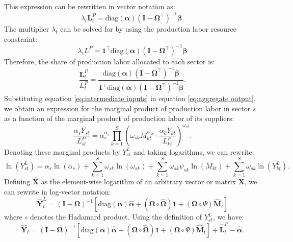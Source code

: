 \documentclass[12pt]{article}
\begin{document}
This expression can be rewritten in vector notation as:
\begin{equation*}
    \lambda_t \mathbf{L}_t^P = \text{diag}(\bm{\alpha}) (\mathbf{I} - \bm{\Omega}^{\top})^{-1} \bm{\beta}.
\end{equation*}
The multiplier $\lambda_t$ can be solved for by using the production labor resource constraint:
\begin{equation*}
    \lambda_t L^P = \mathbf{1}^{\top} \text{diag}(\bm{\alpha}) (\mathbf{I} - \bm{\Omega}^{\top})^{-1} \bm{\beta}
\end{equation*}
Therefore, the share of production labor allocated to each sector is:
\begin{equation*}
    \frac{\mathbf{L}_t^P}{L_t^P} = \frac{\text{diag}(\bm{\alpha}) (\mathbf{I} - \bm{\Omega}^{\top})^{-1} \bm{\beta}}{\mathbf{1}^{\top} \text{diag}(\bm{\alpha}) (\mathbf{I} - \bm{\Omega}^{\top})^{-1} \bm{\beta}}.
\end{equation*}
Substituting equation \eqref{eq:intermediate inputs} in equation \eqref{eq:aggregate output}, we obtain an expression for the marginal product of production labor in sector $s$ as a function of the marginal product of production labor of its suppliers:
\begin{equation*}
    \frac{\alpha_s Y_{st}}{L_{st}^P} = \alpha_s^{\alpha_s} \prod_{k = 1}^S \left(\omega_{sk} M_{kt}^{\psi_{sk}} \cdot \frac{\alpha_k Y_{kt}}{L_{kt}^P}\right)^{\omega_{sk}}.
\end{equation*}
Denoting these marginal products by $Y_{st}^L$ and taking logarithms, we can rewrite:
\begin{equation*}
    \ln(Y_{st}^L) = \alpha_s \ln(\alpha_s) + \sum_{k = 1}^S \omega_{sk} \ln(\omega_{sk}) + \sum_{k = 1}^S \omega_{sk} \psi_{sk} \ln(M_{kt}) + \sum_{k = 1}^S \omega_{sk} \ln(Y_{kt}^L).
\end{equation*}
Defining $\hat{\mathbf{X}}$ as the element-wise logarithm of an arbitrary vector or matrix $\mathbf{X}$, we can rewrite in log-vector notation:
\begin{equation*}
    \hat{\mathbf{Y}}_t^L = (\mathbf{I} - \bm{\Omega})^{-1} [\text{diag}(\bm{\alpha}) \hat{\bm{\alpha}} + (\bm{\Omega} \circ \hat{\bm{\Omega}}) \mathbf{1} + (\bm{\Omega} \circ \Psi) \hat{\mathbf{M}}_t]
\end{equation*}
where $\circ$ denotes the Hadamard product. Using the definition of $Y_{st}^L$, we have:
\begin{equation*}
    \hat{\mathbf{Y}}_t = (\mathbf{I} - \bm{\Omega})^{-1} [\text{diag}(\bm{\alpha}) \hat{\bm{\alpha}} + (\bm{\Omega} \circ \hat{\bm{\Omega}}) \mathbf{1} + (\bm{\Omega} \circ \Psi) \hat{\mathbf{M}}_t] + \hat{\mathbf{L}}_t^P - \hat{\bm{\alpha}}.
\end{equation*}
\end{document}
